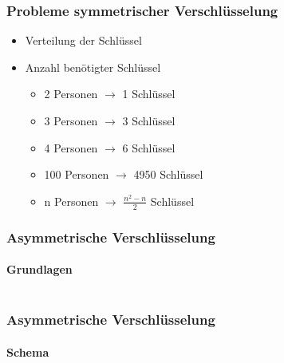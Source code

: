 \begin{frame}
  \frametitle{Probleme symmetrischer Verschlüsselung}
  \begin{itemize}
    \item Verteilung der Schlüssel
    \item Anzahl benötigter Schlüssel
    \begin{itemize}
      \item 2 Personen $\rightarrow$ 1 Schlüssel
      \item 3 Personen $\rightarrow$ 3 Schlüssel
      \pause
      \item 4 Personen $\rightarrow$ 6 Schlüssel
      \item 100 Personen $\rightarrow$ 4950 Schlüssel
      \item n Personen $\rightarrow$ $\frac{n^2-n}{2}$ Schlüssel
    \end{itemize}
  \end{itemize}
\end{frame}

\begin{frame}
  \frametitle{Asymmetrische Verschlüsselung}
  \framesubtitle{Grundlagen}
  \begin{columns}[c]
    \begin{column}{0.5\textwidth}
      \center {}
    \end{column}
    \begin{column}{0.5\textwidth}
      \center {}
    \end{column}
  \end{columns}
\end{frame}

\begin{frame}
  \frametitle{Asymmetrische Verschlüsselung}
  \framesubtitle{Schema}
  \center {}
\end{frame}
